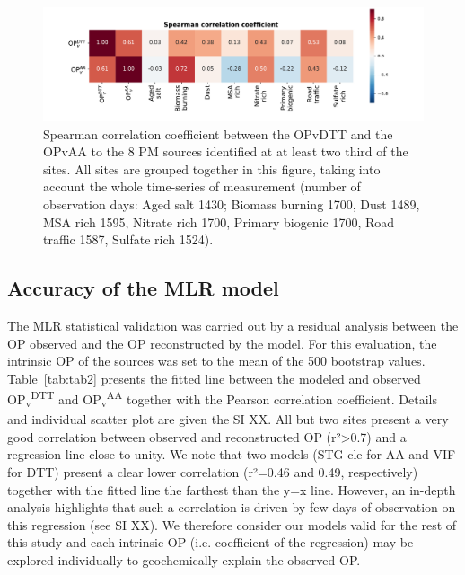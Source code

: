 \documentclass[acp]{copernicus}
\begin{document}
\begin{figure}[ht]
    \centering
    \includegraphics[width=1.0\linewidth]{figures/fig4}
    \caption{
        Spearman correlation coefficient between the OPvDTT and the OPvAA to the 8 PM
        sources identified at at least two third of the sites. All sites are grouped
        together in this figure, taking into account the whole time-series of measurement
        (number of observation days: Aged salt 1430; Biomass burning 1700, Dust 1489, MSA
        rich 1595, Nitrate rich 1700, Primary biogenic 1700, Road traffic 1587, Sulfate
        rich 1524).
    }%
    \label{fig:fig4}
\end{figure}


\subsection{Accuracy of the MLR model}%
\label{accuracy-of-the-mlr-model}

The MLR statistical validation was carried out by a residual analysis
between the OP observed and the OP reconstructed by the model. For this
evaluation, the intrinsic OP of the sources was set to the mean of the
500 bootstrap values. Table~\ref{tab:tab2}
presents the fitted line between the modeled and observed
OP\textsubscript{v}\textsuperscript{DTT} and
OP\textsubscript{v}\textsuperscript{AA} together with the Pearson
correlation coefficient. Details and individual scatter plot are given
the SI XX. All but two sites present a very good correlation between
observed and reconstructed OP (r²\textgreater0.7) and a regression line
close to unity. We note that two models (STG-cle for AA and VIF for DTT)
present a clear lower correlation (r²=0.46 and 0.49, respectively)
together with the fitted line the farthest than the y=x line. However,
an in-depth analysis highlights that such a correlation is driven by few
days of observation on this regression (see SI XX). We therefore
consider our models valid for the rest of this study and each intrinsic
OP (i.e. coefficient of the regression) may be explored individually to
geochemically explain the observed OP.
\end{document}
